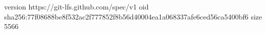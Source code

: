 version https://git-lfs.github.com/spec/v1
oid sha256:77f08688be8f532ac2f777852f8b56d40004ea1a068337afe6ced56ca5400bf6
size 5566

